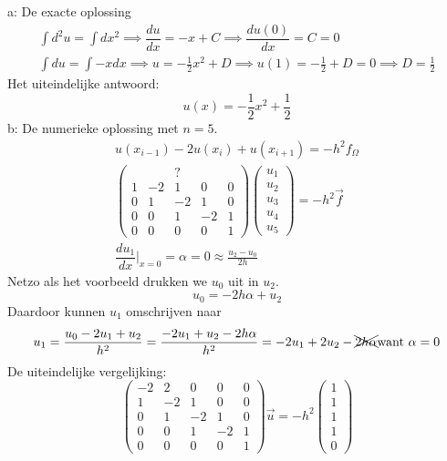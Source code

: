 \documentclass[11pt]{article}
\begin{document}
a: De exacte oplossing\\
\begin{gather*}
\int d^2u=\int dx^2 \implies \dfrac{du}{dx} = -x + C\implies \dfrac{du(0)}{dx} = C = 0\\
\int{du} = \int -x dx \implies u = -\frac{1}{2}x^2 + D \implies u(1) = -\frac{1}{2} + D = 0 \implies D = \frac{1}{2}
\end{gather*}
Het uiteindelijke antwoord:
$$u(x) = -\frac{1}{2}x^2 + \frac{1}{2}$$
b: De numerieke oplossing met $n = 5$.
\begin{gather*}
u(x_{i-1}) - 2u(x_{i}) + u(x_{i+1}) = -h^2f_{\Omega}\\
\begin{pmatrix}
	  &  & ?&  &  \\
	 1&-2& 1& 0& 0\\
	 0& 1&-2& 1& 0\\
	 0& 0& 1&-2& 1\\
	 0& 0& 0& 0& 1
\end{pmatrix}
\begin{pmatrix}
	u_{1}\\
	u_{2}\\
	u_{3}\\
	u_{4}\\
	u_{5}
\end{pmatrix}=-h^2\vec{f}\\
\dfrac{du_{1}}{dx}\Big|_{x = 0} = \alpha = 0\approx \frac{u_{2}-u_{0}}{2h}
\end{gather*}
Netzo als het voorbeeld drukken we $u_{0}$ uit in $u_{2}$.
$$
u_{0} = -2h\alpha + u_{2}
$$
Daardoor kunnen $u_{1}$ omschrijven naar
$$
u_{1} = \frac{u_{0}-2u_{1}+u_{2}}{h^2} = \frac{-2u_{1}+u_{2}-2h\alpha}{h^2} = -2u_{1} + 2u_{2} - \xcancel{2h\alpha} \text{want } \alpha = 0
$$
De uiteindelijke vergelijking:
$$
\begin{pmatrix}
	-2& 2& 0& 0& 0\\
	 1&-2& 1& 0& 0\\
	 0& 1&-2& 1& 0\\
	 0& 0& 1&-2& 1\\
	 0& 0& 0& 0& 1
\end{pmatrix}
\vec{u} = -h^2
\begin{pmatrix}
1\\
1\\
1\\
1\\
0
\end{pmatrix}
$$
\end{document}
